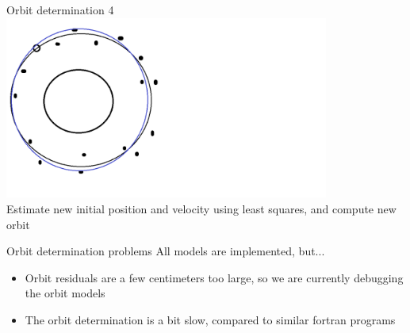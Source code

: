 \documentclass[12pt]{beamer}
\begin{document}
\begin{frame}{Orbit determination 4}
\includegraphics[width=0.8\textwidth]{figure/orbit4.png} \\ Estimate new initial position and velocity using least squares, and compute new orbit 
\end{frame}


\begin{frame}{Orbit determination problems}
  All models are implemented, but...
\begin{itemize}
\item 
  Orbit residuals are a few centimeters too large, so we are currently debugging the orbit models
\item
  The orbit determination is a bit slow, compared to similar fortran programs
\end{itemize}
\end{frame}
\end{document}
